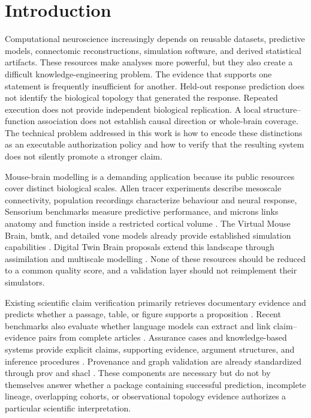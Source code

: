 \section{Introduction}
\label{sec:introduction}

Computational neuroscience increasingly depends on reusable datasets, predictive models, connectomic reconstructions, simulation software, and derived statistical artifacts. These resources make analyses more powerful, but they also create a difficult knowledge-engineering problem. The evidence that supports one statement is frequently insufficient for another. Held-out response prediction does not identify the biological topology that generated the response. Repeated execution does not provide independent biological replication. A local structure--function association does not establish causal direction or whole-brain coverage. The technical problem addressed in this work is how to encode these distinctions as an executable authorization policy and how to verify that the resulting system does not silently promote a stronger claim.

Mouse-brain modelling is a demanding application because its public resources cover distinct biological scales. Allen tracer experiments describe mesoscale connectivity, population recordings characterize behaviour and neural response, Sensorium benchmarks measure predictive performance, and \ac{microns} links anatomy and function inside a restricted cortical volume \citep{oh2014mesoscale,willeke2022sensorium,turishcheva2023dynamic,bae2025microns}. The Virtual Mouse Brain, \ac{bmtk}, and detailed \ac{vone} models already provide established simulation capabilities \citep{melozzi2017virtualmouse,dai2020bmtk,billeh2020v1}. Digital Twin Brain proposals extend this landscape through assimilation and multiscale modelling \citep{xiong2023dtb,chen2026mousedtb}. None of these resources should be reduced to a common quality score, and a validation layer should not reimplement their simulators.

Existing scientific claim verification primarily retrieves documentary evidence and predicts whether a passage, table, or figure supports a proposition \citep{wadden2020scifact,wadden2022multivers,lu2023scitab,wang2025sciver}. Recent benchmarks also evaluate whether language models can extract and link claim--evidence pairs from complete articles \citep{javaji2025claimbench}. Assurance cases and knowledge-based systems provide explicit claims, supporting evidence, argument structures, and inference procedures \citep{buchanan1984rulebased,studer1998knowledge,mohamad2021assurance}. Provenance and graph validation are already standardized through \ac{prov} and \ac{shacl} \citep{lebo2013provo,w3c2017shacl}. These components are necessary but do not by themselves answer whether a package containing successful prediction, incomplete lineage, overlapping cohorts, or observational topology evidence authorizes a particular scientific interpretation.

